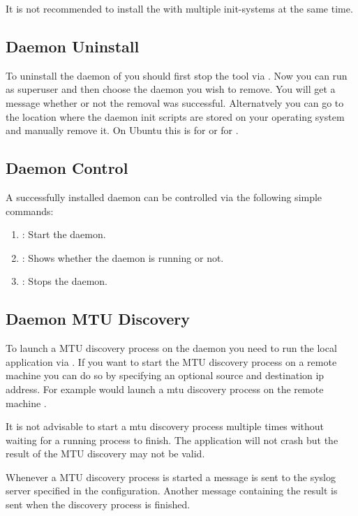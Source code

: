 It is not recommended to install the \entool{} with multiple init-systems at the same time.

\subsection{Daemon Uninstall}
To uninstall the daemon of \entool{} you should first stop the tool via . Now you can run  as superuser and then choose the daemon you wish to remove. You will get a message whether or not the removal was successful. Alternatvely you can go to the location where the daemon init scripts are stored on your operating system and manually remove it. On Ubuntu this is  for  or  for .

\subsection{Daemon Control}
A successfully installed daemon can be controlled via the following simple commands:

\begin{enumerate}
  \item {}: Start the daemon.
  \item {}: Shows whether the daemon is running or not.
  \item {}: Stops the daemon.
\end{enumerate}

\subsection{Daemon MTU Discovery}
To launch a \acs{MTU} discovery process on the daemon you need to run the local application via . If you want to start the \acs{MTU} discovery process on a remote machine you can do so by specifying an optional source and destination ip address. For example  would launch a mtu discovery process on the remote machine .

It is not advisable to start a mtu discovery process multiple times without waiting for a running process to finish. The application will not crash but the result of the \acs{MTU} discovery may not be valid.

Whenever a \acs{MTU} discovery process is started a message is sent to the syslog server specified in the configuration. Another message containing the result is sent when the discovery process is finished.

